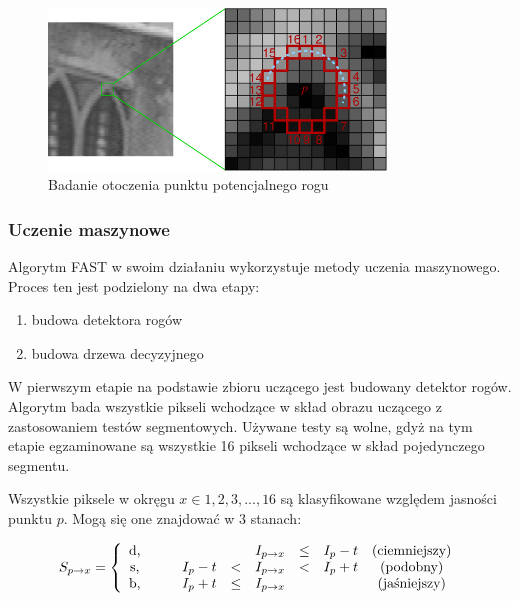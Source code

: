 \begin{figure}[!htb]
\centering
\includegraphics[width=0.8\textwidth]{pict/02/fast/fast_test_segment.png}
\caption{Badanie otoczenia punktu potencjalnego rogu}
\label{fig:fast_test_segment}
\end{figure}





\subsubsection{Uczenie maszynowe}
Algorytm FAST w swoim działaniu wykorzystuje metody uczenia maszynowego. Proces ten jest podzielony na dwa etapy:
\begin{enumerate}
\item budowa detektora rogów
\item budowa drzewa decyzyjnego
\end{enumerate}


W pierwszym etapie na podstawie zbioru uczącego jest budowany detektor rogów. Algorytm bada wszystkie pikseli wchodzące w skład obrazu uczącego z zastosowaniem testów segmentowych. Używane testy są wolne, gdyż na tym etapie egzaminowane są wszystkie 16 pikseli wchodzące w skład pojedynczego segmentu.

Wszystkie piksele w okręgu $x\in{1,2,3,...,16}$ są klasyfikowane względem jasności punktu $p$. Mogą się one znajdować w 3 stanach:

\begin{equation}
S_{p\rightarrow x} = 
\left\lbrace\begin{array}{cccccccccc}
$d,$ & & &            &      & I_{p\rightarrow x} & \leq & I_{p} - t   &  $(ciemniejszy)$  \\
$s,$ & & & I_{p} - t  & <    & I_{p\rightarrow x} & <    & I_{p} + t   &  $(podobny)$  \\
$b,$ & & & I_{p} + t  & \leq & I_{p\rightarrow x} &      &             &  $(jaśniejszy)$  \\
\end{array}\right.
\end{equation}


